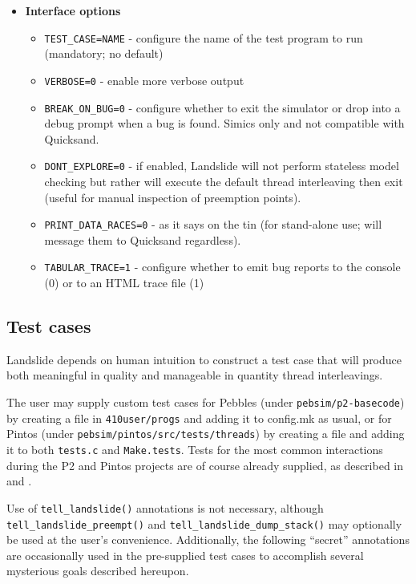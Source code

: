 \begin{itemize}
\item {\bf Interface options}
\begin{itemize}
	\item {\tt TEST\_CASE=NAME} - configure the name of the test program to run (mandatory; no default)
	\item {\tt VERBOSE=0} - enable more verbose output
	\item {\tt BREAK\_ON\_BUG=0} - configure whether to exit the simulator or drop into a debug prompt when a bug is found. Simics only and not compatible with Quicksand.
	\item {\tt DONT\_EXPLORE=0} - if enabled, Landslide will not perform stateless model checking but rather will execute the default thread interleaving then exit (useful for manual inspection of preemption points).
	\item {\tt PRINT\_DATA\_RACES=0} - as it says on the tin (for stand-alone use; will message them to Quicksand regardless).
	\item {\tt TABULAR\_TRACE=1} - configure whether to emit bug reports to the console (0) or to an HTML trace file (1)
\end{itemize}
\end{itemize}


\subsection{Test cases}
\label{sec:landslide-testcases}

Landslide depends on human intuition to construct a test case
that will produce both meaningful in quality and manageable in quantity thread interleavings.

The user may supply custom test cases
for Pebbles (under {\tt pebsim/p2-basecode})
by creating a file in {\tt 410user/progs} and adding it to config.mk as usual,
or for Pintos (under {\tt pebsim/pintos/src/tests/threads})
by creating a file and adding it to both {\tt tests.c} and {\tt Make.tests}.
Tests for the most common interactions during the P2 and Pintos projects are of course already supplied,
as described in \sect{\ref{sec:education-pebbles-tests}} and \sect{\ref{sec:education-pintos-tests}}.

Use of {\tt tell\_landslide()} annotations is not necessary,
although {\tt tell\_landslide\_\allowbreak{}preempt()} and {\tt tell\_landslide\_dump\_stack()}
may optionally be used at the user's convenience.
Additionally, the following ``secret'' annotations
are occasionally used in the pre-supplied test cases
to accomplish several mysterious goals described hereupon.

